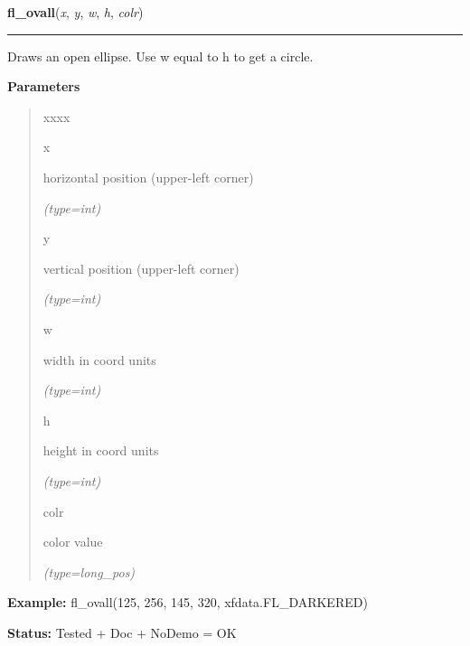     \label{xformslib:flxbasic:fl_ovall}

    \vspace{0.5ex}

\hspace{.8\funcindent}\begin{boxedminipage}{\funcwidth}

    \raggedright \textbf{fl\_ovall}(\textit{x}, \textit{y}, \textit{w}, \textit{h}, \textit{colr})

    \vspace{-1.5ex}

    \rule{\textwidth}{0.5\fboxrule}
\setlength{\parskip}{2ex}
    Draws an open ellipse. Use w equal to h to get a circle.

\setlength{\parskip}{1ex}
      \textbf{Parameters}
      \vspace{-1ex}

      \begin{quote}
        \begin{Ventry}{xxxx}

          \item[x]

          horizontal position (upper-left corner)

            {\it (type=int)}

          \item[y]

          vertical position (upper-left corner)

            {\it (type=int)}

          \item[w]

          width in coord units

            {\it (type=int)}

          \item[h]

          height in coord units

            {\it (type=int)}

          \item[colr]

          color value

            {\it (type=long\_pos)}

        \end{Ventry}

      \end{quote}

\textbf{Example:} fl\_ovall(125, 256, 145, 320, xfdata.FL\_DARKERED)



\textbf{Status:} Tested + Doc + NoDemo = OK



    \end{boxedminipage}

